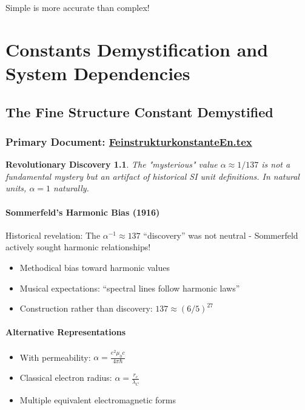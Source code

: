 \documentclass[12pt,a4paper]{report}
\newtheorem{discovery}{Revolutionary Discovery}[chapter]
\begin{document}
	Simple is more accurate than complex!
	
	\chapter{Constants Demystification and System Dependencies}
	
	\section{The Fine Structure Constant Demystified}
	\subsection{Primary Document: \href{https://github.com/jpascher/T0-Time-Mass-Duality/tree/main/2/pdf/FeinstrukturkonstanteEn.pdf}{FeinstrukturkonstanteEn.tex}}
	
	\begin{discovery}
		The "mysterious" value $\alpha \approx 1/137$ is not a fundamental mystery but an artifact of historical SI unit definitions. In natural units, $\alpha = 1$ naturally.
	\end{discovery}
	
	\subsubsection{Sommerfeld's Harmonic Bias (1916)}
	Historical revelation: The $\alpha^{-1} \approx 137$ ``discovery'' was not neutral - 
	Sommerfeld actively sought harmonic relationships!
	\begin{itemize}
		\item Methodical bias toward harmonic values
		\item Musical expectations: ``spectral lines follow harmonic laws''
		\item Construction rather than discovery: $137 \approx (6/5)^{27}$
	\end{itemize}
	
	\subsubsection{Alternative Representations}
	\begin{itemize}
		\item With permeability: $\alpha = \frac{e^2 \mu_0 c}{4\pi \hbar}$
		\item Classical electron radius: $\alpha = \frac{r_e}{\lambda_C}$
		\item Multiple equivalent electromagnetic forms
	\end{itemize}
	
\end{document}
